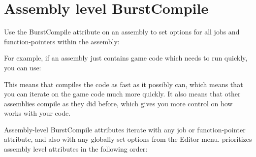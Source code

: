 \chapter{Assembly level Burst\+Compile}
\hypertarget{md__hey_tea_9_2_library_2_package_cache_2com_8unity_8burst_0d1_88_87_2_documentation_0i_2compilation-burstcompile-assembly}{}\label{md__hey_tea_9_2_library_2_package_cache_2com_8unity_8burst_0d1_88_87_2_documentation_0i_2compilation-burstcompile-assembly}
\label{md__hey_tea_9_2_library_2_package_cache_2com_8unity_8burst_0d1_88_87_2_documentation_0i_2compilation-burstcompile-assembly_autotoc_md295}%
%
 Use the {\ttfamily Burst\+Compile} attribute on an assembly to set options for all  jobs and function-\/pointers within the assembly\+:


\begin{DoxyCode}{0}
\DoxyCodeLine{\textcolor{preprocessor}{\ \#}}
\DoxyCodeLine{[assembly:\ BurstCompile(CompileSynchronously\ =\ \textcolor{keyword}{true})]}

\end{DoxyCode}


For example, if an assembly just contains game code which needs to run quickly, you can use\+:


\begin{DoxyCode}{0}
\DoxyCodeLine{\textcolor{preprocessor}{\ \#}}
\DoxyCodeLine{[assembly:\ BurstCompile(OptimizeFor\ =\ \mbox{\hyperlink{namespace_unity_1_1_burst_aeae1a1ecc1c6ea7b35442c0175b325ad}{OptimizeFor}}.FastCompilation)]}

\end{DoxyCode}


This means that  compiles the code as fast as it possibly can, which means that you can iterate on the game code much more quickly. It also means that other assemblies compile as they did before, which gives you more control on how  works with your code.

Assembly-\/level {\ttfamily Burst\+Compile} attributes iterate with any job or function-\/pointer attribute, and also with any globally set options from the  Editor menu.  prioritizes assembly level attributes in the following order\+:


